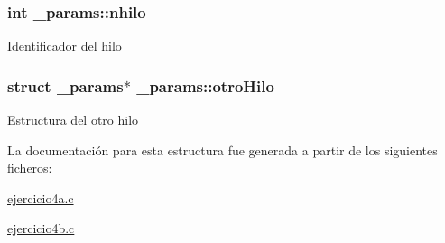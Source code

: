 \subsubsection[{\texorpdfstring{nhilo}{nhilo}}]{\setlength{\rightskip}{0pt plus 5cm}int \+\_\+params\+::nhilo}\hypertarget{struct__params_a160a4d501715e51cfa0a2f289b6c5b14}{}\label{struct__params_a160a4d501715e51cfa0a2f289b6c5b14}
Identificador del hilo 
\subsubsection[{\texorpdfstring{otro\+Hilo}{otroHilo}}]{\setlength{\rightskip}{0pt plus 5cm}struct {\bf \+\_\+params}$\ast$ \+\_\+params\+::otro\+Hilo}\hypertarget{struct__params_a21ba0961d6fcfa8c876ba58142d181be}{}\label{struct__params_a21ba0961d6fcfa8c876ba58142d181be}
Estructura del otro hilo 

La documentación para esta estructura fue generada a partir de los siguientes ficheros\+:\begin{DoxyCompactItemize}
\item 
\hyperlink{ejercicio4a_8c}{ejercicio4a.\+c}\item 
\hyperlink{ejercicio4b_8c}{ejercicio4b.\+c}\end{DoxyCompactItemize}
